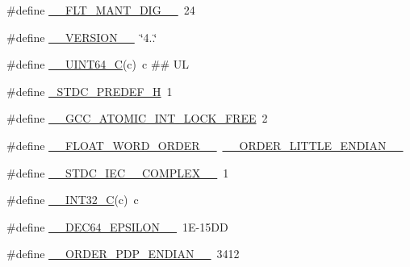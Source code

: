 \begin{DoxyCompactItemize}
\item 
\#define \hyperlink{build-analizer__host-_desktop___qt__5__9__0___g_c_c__64bit-_release_2moc__predefs_8h_aeacc238625932b11e6cda685357dd678}{\+\_\+\+\_\+\+F\+L\+T\+\_\+\+M\+A\+N\+T\+\_\+\+D\+I\+G\+\_\+\+\_\+}~24
\item 
\#define \hyperlink{build-analizer__host-_desktop___qt__5__9__0___g_c_c__64bit-_release_2moc__predefs_8h_a5b753f1dbbed79a7126b24ca512246d5}{\+\_\+\+\_\+\+V\+E\+R\+S\+I\+O\+N\+\_\+\+\_\+}~\char`\"{}4..\char`\"{}
\item 
\#define \hyperlink{build-analizer__host-_desktop___qt__5__9__0___g_c_c__64bit-_release_2moc__predefs_8h_a405cee4934ed56c9a4aa4e7dc4380bd2}{\+\_\+\+\_\+\+U\+I\+N\+T64\+\_\+\+C}(c)~c \#\# U\+L
\item 
\#define \hyperlink{build-analizer__host-_desktop___qt__5__9__0___g_c_c__64bit-_release_2moc__predefs_8h_a198efb9bd9b8de1c44f470b6c6ddf69d}{\+\_\+\+S\+T\+D\+C\+\_\+\+P\+R\+E\+D\+E\+F\+\_\+\+H}~1
\item 
\#define \hyperlink{build-analizer__host-_desktop___qt__5__9__0___g_c_c__64bit-_release_2moc__predefs_8h_ab6ba7de2838beb20b1eaca71c062c8e2}{\+\_\+\+\_\+\+G\+C\+C\+\_\+\+A\+T\+O\+M\+I\+C\+\_\+\+I\+N\+T\+\_\+\+L\+O\+C\+K\+\_\+\+F\+R\+E\+E}~2
\item 
\#define \hyperlink{build-analizer__host-_desktop___qt__5__9__0___g_c_c__64bit-_release_2moc__predefs_8h_a2db444477ad8f9aa0759310d46694339}{\+\_\+\+\_\+\+F\+L\+O\+A\+T\+\_\+\+W\+O\+R\+D\+\_\+\+O\+R\+D\+E\+R\+\_\+\+\_\+}~\hyperlink{build-analizer__host-_desktop___qt__5__9__0___g_c_c__64bit-_release_2moc__predefs_8h_a2b695357ce4b46971d54e8e9dfe5724f}{\+\_\+\+\_\+\+O\+R\+D\+E\+R\+\_\+\+L\+I\+T\+T\+L\+E\+\_\+\+E\+N\+D\+I\+A\+N\+\_\+\+\_\+}
\item 
\#define \hyperlink{build-analizer__host-_desktop___qt__5__9__0___g_c_c__64bit-_release_2moc__predefs_8h_a7b5b9dc07de6dd5c39c59b0ac260f943}{\+\_\+\+\_\+\+S\+T\+D\+C\+\_\+\+I\+E\+C\+\_\+\_\+\+C\+O\+M\+P\+L\+E\+X\+\_\+\+\_\+}~1
\item 
\#define \hyperlink{build-analizer__host-_desktop___qt__5__9__0___g_c_c__64bit-_release_2moc__predefs_8h_a3ef70e13cfbe3264fe0b212f8f46d76c}{\+\_\+\+\_\+\+I\+N\+T32\+\_\+\+C}(c)~c
\item 
\#define \hyperlink{build-analizer__host-_desktop___qt__5__9__0___g_c_c__64bit-_release_2moc__predefs_8h_a189bb13aac101f45c8ac7f6e52daccfa}{\+\_\+\+\_\+\+D\+E\+C64\+\_\+\+E\+P\+S\+I\+L\+O\+N\+\_\+\+\_\+}~1\+E-\/15\+D\+D
\item 
\#define \hyperlink{build-analizer__host-_desktop___qt__5__9__0___g_c_c__64bit-_release_2moc__predefs_8h_a94ead674b2441dc29dbd5d6aba467197}{\+\_\+\+\_\+\+O\+R\+D\+E\+R\+\_\+\+P\+D\+P\+\_\+\+E\+N\+D\+I\+A\+N\+\_\+\+\_\+}~3412

\end{DoxyCompactItemize}
